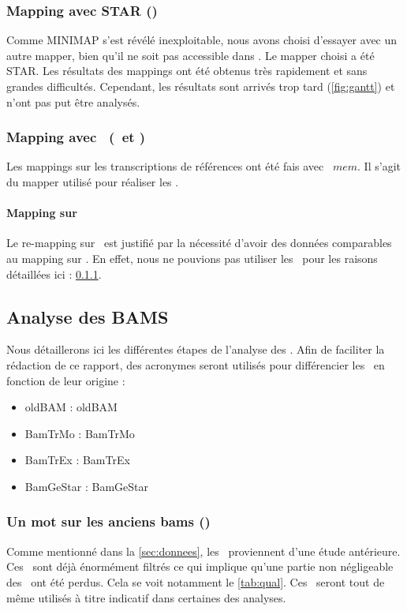 \documentclass[../main]{subfiles} %
\begin{document}
\subsubsection{Mapping avec \gls{STAR} (\GeMo)}
\label{sec:Star}
Comme \gls{MINIMAP} s’est révélé inexploitable, nous avons choisi d’essayer avec un autre mapper, bien qu’il ne soit pas accessible dans \GeCKO. Le mapper choisi a été \gls{STAR}. Les résultats des \glspl{mapping} ont été obtenus très rapidement et sans grandes difficultés. Cependant, les résultats sont arrivés trop tard (\cref{fig:gantt}) et n'ont pas put être analysés. 



\subsubsection{Mapping avec \BWA (\TrEx et \TrMo)}
Les mappings sur les transcriptions de références ont été fais avec \BWA $mem$. Il s’agit du mapper utilisé pour réaliser les \OldBam.

\paragraph{Mapping sur \TrEx} Le re-mapping sur \TrEx est justifié par la nécessité d'avoir des données comparables au \gls{mapping} sur \TrMo. En effet, nous ne pouvions pas utiliser les \OldBam pour les raisons détaillées ici : \ref{sec:oldBam}. 




\subsection{Analyse des BAMS}
Nous détaillerons ici les différentes étapes de l'analyse des \bam.
Afin de faciliter la rédaction de ce rapport, des acronymes seront utilisés pour différencier les \bam en fonction de leur origine :
\begin{itemize}
    \item \acrshort{oldBAM} : \acrlong{oldBAM}
    \item \acrshort{BamTrMo} : \acrlong{BamTrMo}
    \item \acrshort{BamTrEx} : \acrlong{BamTrEx}
    \item \acrshort{BamGeStar} : \acrlong{BamGeStar}
\end{itemize}



\subsubsection{Un mot sur les anciens bams (\OldBam)}
\label{sec:oldBam}
Comme mentionné dans la \cref{sec:donnees}, les \OldBam proviennent d'une étude antérieure. Ces \bam sont déjà énormément filtrés ce qui implique qu'une partie non négligeable des \reads ont été perdus. Cela se voit notamment le \cref{tab:qual}. Ces \bam seront tout de même utilisés à titre indicatif dans certaines des analyses.
\end{document}
